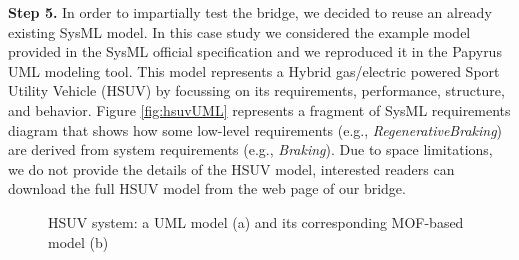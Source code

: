 \textbf{Step 5.} In order to impartially test the bridge, we decided to reuse an already existing SysML model. 
In this case study we considered the example model provided in the SysML official specification and we reproduced it in the Papyrus UML modeling tool.
This model represents a Hybrid gas/electric powered Sport Utility Vehicle (HSUV) by focussing on its requirements, performance, structure, and behavior. Figure \ref{fig:hsuvUML} represents a fragment of SysML requirements diagram that shows how some low-level requirements
(e.g., \textit{RegenerativeBraking})
are derived from system requirements (e.g., \textit{Braking}). Due to space limitations, we do not provide the details of the HSUV model, interested readers can download the full HSUV model from the web page of our bridge. 

\begin{figure}
  \centering
 \hspace{2mm}
  \caption{HSUV system: a UML model (a) and its corresponding MOF-based model (b)}
  \label{fig:hsuv}
\end{figure}
